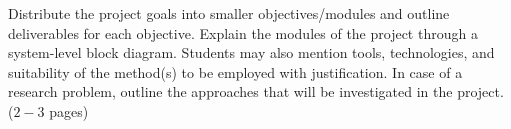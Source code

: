 Distribute the project goals into smaller objectives/modules and outline deliverables for each objective. Explain the modules of the project through a system-level block diagram. Students may also mention tools, technologies, and suitability of the method(s) to be employed with justification. In case of a research problem, outline the approaches that will be investigated in the project. ($2-3$ pages)

